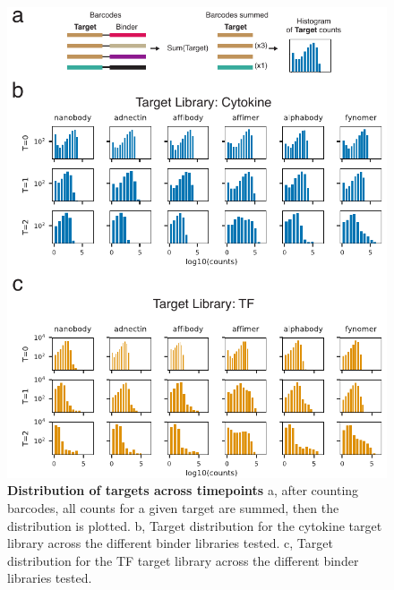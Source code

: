 \begin{figure}
\includegraphics[width=\textwidth]{figures/chapter3/20190621_fig4_target_histograms.pdf}
\caption[Distribution of targets across timepoints]{\textbf{Distribution of targets across timepoints}
a, after counting barcodes, all counts for a given target are summed, then the distribution is plotted. b, Target distribution for the cytokine target library across the different binder libraries tested. c, Target distribution for the TF target library across the different binder libraries tested.
\label{chap3-target-histograms}}
\end{figure}

